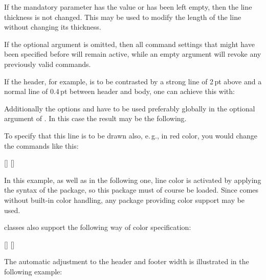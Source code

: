 If the mandatory parameter has the value  or has been
left empty, then the line thickness is not changed.  This may be used
to modify the length of the line without changing its thickness.

If the optional argument  is omitted, then all command
settings that might have been specified before will remain active,
while an empty  argument will revoke any previously
valid commands.

\begin{Example}
  If the header, for example, is to be contrasted by a strong line of
  2\,pt above and a normal line of 0.4\,pt between header and body,
  one can achieve this with:
\begin{lstcode}
  \setheadtopline{2pt}
  \setheadsepline{.4pt}
\end{lstcode}
  Additionally the options  and
   have to be used preferably globally in the optional
  argument of . In this case the result may be the
  following.
%
\begin{XmpTopPage}
        \thinlines{}
        \thicklines{}
\end{XmpTopPage}

   To specify that this line is to be drawn also, e.\,g., in red color, you 
   would change the commands like this:
\begin{lstcode}
  \setheadtopline{2pt}[\color{red}]
  \setheadsepline{.4pt}[\color{red}]
\end{lstcode}
  In this example, as well as in the following one, line color is
  activated by applying the syntax of the
   package, so this package must of
  course be loaded. Since  comes without built-in
  color handling, any package providing color support may be used.

  {\KOMAScript} classes also support the following way of color specification:
\begin{lstcode}
  \setheadtopline{2pt}
  \setheadsepline{.4pt}
  [\color{red}]
  [\color{red}]
\end{lstcode}

  The automatic adjustment to the header and footer width is illustrated
  in the following example:
\begin{lstcode}
  \setfootbotline{2pt}
  \setfootsepline[text]{.4pt}
\end{lstcode}

  \label{page:scrpage-en.autoLineLength}
  \begin{XmpBotPage}
    \thinlines{}
    \thicklines{}
  \end{XmpBotPage}
\end{Example}
